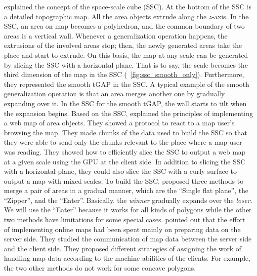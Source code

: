 \documentclass[ijgi,article,submit,moreauthors,pdftex]{Definitions/mdpi}
\begin{document}
 explained the concept of the space-scale cube (SSC).
At the bottom of the SSC is a detailed topographic map.
All the area objects extrude along the $z$-axis.
In the SSC, an area on map becomes a polyhedron, and
the common boundary of two areas is a vertical wall.
Whenever a generalization operation happens, 
the extrusions of the involved areas stop;
then, the newly generated areas take the place and start to extrude.
On this basis, the map at any scale can be generated by slicing the SSC 
with a horizontal plane.
That is to say, the scale becomes the third dimension of the map in the SSC
(\eg~\fig\ref{fig:ssc_smooth_only}).
Furthermore, they represented the smooth tGAP in the SSC.
A typical example of the smooth generalization operation is that 
an area merges another one by gradually expanding over it.
In the SSC for the smooth tGAP, 
the wall starts to tilt when the expansion begins.
Based on the SSC, \citet{Meijers2020Web} explained the principles of 
implementing a web map of area objects.
They showed a protocol to react to a map user's browsing the map.
They made chunks of the data used to build the SSC
so that they were able to send only the chunks relevant to the place
where a map user was reading.
They showed how to efficiently slice the SSC to output a web map at a given scale 
using the GPU at the client side.
In addition to slicing the SSC with a horizontal plane,
they could also slice the SSC with a curly surface 
to output a map with mixed scales.
To build the SSC, \citet{Suba2014Merge} proposed three methods 
to merge a pair of areas in a gradual manner, 
which are the ``Single flat plane'', the ``Zipper'', and the ``Eater''.
Basically, the \emph{winner} gradually expands over the \emph{loser}.
We will use the ``Eater'' because it works for all kinds of polygons 
while the other two methods have limitations for some special cases.
\citet{Huang2016Webmap} pointed out that
the effort of implementing online maps 
had been spent mainly on preparing data on the server side.
They studied the communication of map data 
between the server side and the client side.
They proposed different strategies of assigning 
the work of handling map data
according to the machine abilities of the clients.
For example, the two other methods do not work for some concave polygons.
\end{document}
